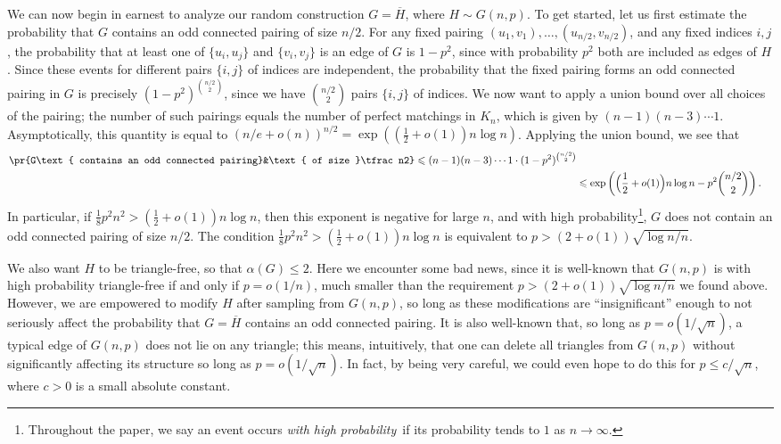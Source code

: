 \documentclass[11pt,reqno,oneside]{amsart}
\theoremstyle{definition}
\newcommand\ol[1]{\overline{#1}}
\newcommand\1{\mathbf{1}}
\let\leq\leqslant
\begin{document}
We can now begin in earnest to analyze our random construction $G = \ol H$, where $H \sim G(n,p)$. To get started, let us first estimate the probability that $G$ contains an odd connected pairing of size $n/2$. For any fixed pairing $(u_1,v_1),\dots,(u_{n/2},v_{n/2})$, and any fixed indices $i,j$, the probability that at least one of $\{u_i,u_j\}$ and $\{v_i,v_j\}$ is an edge of $G$ is $1-p^2$, since with probability $p^2$ both are included as edges of $H$. Since these events for different pairs $\{i,j\}$ of indices are independent, the probability that the fixed pairing forms an odd connected pairing in $G$ is precisely $(1-p^2)^{\binom{n/2}2}$, since we have $\binom{n/2}2$ pairs $\{i,j\}$ of indices. We now want to apply a union bound over all choices of the pairing; the number of such pairings equals the number of perfect matchings in $K_n$, which is given by $(n-1)(n-3)\dotsm 1$. Asymptotically, this quantity is equal to $(n/e+o(n))^{n/2} = \exp((\frac 12 +o(1))n\log n)$. Applying the union bound, we see that
\begin{align*}
\pr{G\text{ contains an odd connected pairing}&\text{ of size }\tfrac n2}\leq (n-1)(n-3)\dotsm 1 \cdot (1-p^2)^{\binom{n/2}2}\\
&\leq \exp\left(\Big(\frac 12 + o(1)\Big)n\log n-p^2 \binom{n/2}2\right).
\end{align*}
In particular, if $\frac 18 p^2 n^2 > (\frac 12+o(1))  n \log n$, then this exponent is negative for large $n$, and with high probability\footnote{Throughout the paper, we say an event occurs \emph{with high probability}\ if its probability tends to $1$ as $n\to \infty$.}, $G$ does not contain an odd connected pairing of size $n/2$. The condition $\frac 18 p^2 n^2 > (\frac 12+o(1)) n \log n$ is equivalent to $p>(2+o(1))\sqrt{\log n/n}$.

We also want $H$ to be triangle-free, so that $\alpha(G)\leq 2$. Here we encounter some bad news, since it is well-known that $G(n,p)$ is with high probability triangle-free if and only if $p = o(1/n)$, much smaller than the requirement $p>(2+o(1))\sqrt{\log n/n}$ we found above. However, we are empowered to modify $H$ after sampling from $G(n,p)$, so long as these modifications are ``insignificant'' enough to not seriously affect the probability that $G=\ol H$ contains an odd connected pairing. It is also well-known that, so long as $p = o(1/\sqrt n)$, a typical edge of $G(n,p)$ does not lie on any triangle; this means, intuitively, that one can delete all triangles from $G(n,p)$ without significantly affecting its structure so long as $p = o(1/\sqrt n)$. In fact, by being very careful, we could even hope to do this for $p \leq c/\sqrt n$, where $c>0$ is a small absolute constant.
\end{document}
